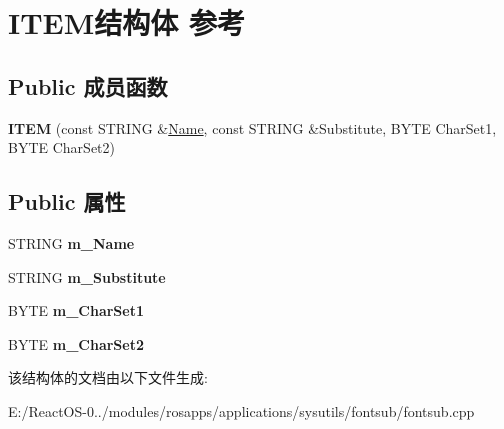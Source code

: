\hypertarget{struct_i_t_e_m}{}\section{I\+T\+E\+M结构体 参考}
\label{struct_i_t_e_m}
\subsection*{Public 成员函数}
\begin{DoxyCompactItemize}
\item 
\mbox{\label{struct_i_t_e_m_a4136cab44ba4a9995cae3c7ee1a4977f}} 
{\bfseries I\+T\+EM} (const S\+T\+R\+I\+NG \&\hyperlink{struct_name_rec__}{Name}, const S\+T\+R\+I\+NG \&Substitute, B\+Y\+TE Char\+Set1, B\+Y\+TE Char\+Set2)
\end{DoxyCompactItemize}
\subsection*{Public 属性}
\begin{DoxyCompactItemize}
\item 
\mbox{\label{struct_i_t_e_m_a44b85fee1f98ef4ab2e106adfb1d16d1}} 
S\+T\+R\+I\+NG {\bfseries m\+\_\+\+Name}
\item 
\mbox{\label{struct_i_t_e_m_a39001566717aa2ca09b01fa132c5e350}} 
S\+T\+R\+I\+NG {\bfseries m\+\_\+\+Substitute}
\item 
\mbox{\label{struct_i_t_e_m_a5a85cd676020403a0e98779df1950787}} 
B\+Y\+TE {\bfseries m\+\_\+\+Char\+Set1}
\item 
\mbox{\label{struct_i_t_e_m_a183fe4c0836e8a0d6243051d12a2a22b}} 
B\+Y\+TE {\bfseries m\+\_\+\+Char\+Set2}
\end{DoxyCompactItemize}


该结构体的文档由以下文件生成\+:\begin{DoxyCompactItemize}
\item 
E\+:/\+React\+O\+S-\/0../modules/rosapps/applications/sysutils/fontsub/fontsub.\+cpp\end{DoxyCompactItemize}
